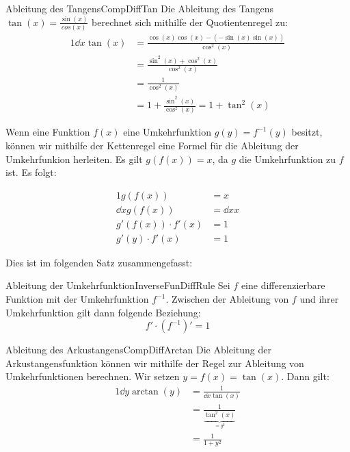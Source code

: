 \begin{example}{Ableitung des Tangens}{CompDiffTan}
    Die Ableitung des Tangens $\tan(x) = \frac{\sin(x)}{cos(x)}$ berechnet sich mithilfe der Quotientenregel zu:
    \begin{alignat*}{1}
        \dd{}{x} \tan(x) &= \frac{\cos(x)\cos(x)-(-\sin(x)\sin(x))}{\cos^2(x)} \\
                         &= \frac{\sin^2(x) + \cos^2(x)}{\cos^2(x)} \\
                         &= \frac{1}{\cos^2(x)} \\
                         &= 1+\frac{\sin^2(x)}{\cos^2(x)} = 1 + \tan^2(x)
    \end{alignat*}
\end{example}

Wenn eine Funktion $f(x)$ eine Umkehrfunktion $g(y) = f^{-1}(y)$ besitzt, können wir mithilfe der Kettenregel eine Formel für die Ableitung der Umkehrfunkion herleiten. Es gilt $g(f(x)) = x$, da $g$ die Umkehrfunktion zu $f$ ist. Es folgt:

\begin{alignat*}{1}
    g(f(x)) &= x \\
    \dd{}{x} g(f(x)) &= \dd{}{x} x \\
    g'(f(x)) \cdot f'(x) &= 1 \\
    g'(y) \cdot f'(x) &= 1
\end{alignat*}

Dies ist im folgenden Satz zusammengefasst:

\begin{statement}{Ableitung der Umkehrfunktion}{InverseFunDiffRule}
    Sei $f$ eine differenzierbare Funktion mit der Umkehrfunktion $f^{-1}$. Zwischen der Ableitung von $f$ und ihrer Umkehrfunktion gilt dann folgende Beziehung:
    $$
        f' \cdot (f^{-1})' = 1
    $$
\end{statement}

\begin{example}{Ableitung des Arkustangens}{CompDiffArctan}
    Die Ableitung der Arkustangensfunktion können wir mithilfe der Regel zur Ableitung von Umkehrfunktionen berechnen. Wir setzen $y = f(x) = \tan(x)$. Dann gilt:
    \begin{alignat*}{1}
        \dd{}{y} \arctan(y) &= \frac{1}{\dd{}{x} \tan(x)} \\
                            &= \frac{1}{\underbrace{\tan^2(x)}_{=y^2}} \\
                            &= \frac{1}{1+y^2}
    \end{alignat*}
\end{example}

